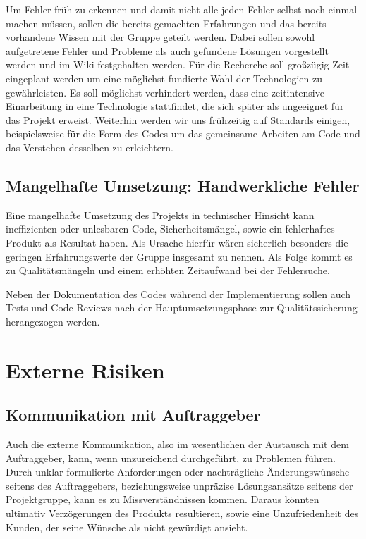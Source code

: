 \massnamen
  Um Fehler früh zu erkennen und damit nicht alle jeden Fehler selbst noch einmal machen müssen, sollen die bereits gemachten Erfahrungen und das bereits vorhandene Wissen mit der Gruppe geteilt werden.
  Dabei sollen sowohl aufgetretene Fehler und Probleme als auch gefundene Lösungen vorgestellt werden und im Wiki festgehalten werden.
  Für die Recherche soll großzügig Zeit eingeplant werden um eine möglichst fundierte Wahl der Technologien zu gewährleisten. Es soll möglichst verhindert werden, dass eine zeitintensive Einarbeitung in eine Technologie stattfindet, die sich später als ungeeignet für das Projekt erweist.
  Weiterhin werden wir uns frühzeitig auf Standards einigen, beispielsweise für die Form des Codes um das gemeinsame Arbeiten am Code und das Verstehen desselben zu erleichtern.

\subsection{Mangelhafte Umsetzung: {\glqq}Handwerkliche Fehler{\grqq}}\label{r10}
Eine mangelhafte Umsetzung des Projekts in technischer Hinsicht kann ineffizienten oder unlesbaren Code, Sicherheitsmängel, sowie ein fehlerhaftes Produkt als Resultat haben. Als Ursache hierfür wären sicherlich besonders die geringen Erfahrungswerte der Gruppe insgesamt zu nennen. Als Folge kommt es zu Qualitätsmängeln und einem erhöhten Zeitaufwand bei der Fehlersuche.

\massnamen
Neben der Dokumentation des Codes während der Implementierung sollen auch Tests und Code-Reviews nach der Hauptumsetzungsphase zur Qualitätssicherung herangezogen werden.

\section{Externe Risiken}

\subsection{Kommunikation mit Auftraggeber}\label{r3}
\bgroup
{}
  Auch die externe Kommunikation, also im wesentlichen der Austausch mit dem Auftraggeber, kann, wenn unzureichend durchgeführt, zu Problemen führen. Durch unklar formulierte Anforderungen oder nachträgliche Änderungswünsche seitens des Auftraggebers, beziehungsweise unpräzise Lösungsansätze seitens der Projektgruppe, kann es zu Missverständnissen kommen. Daraus könnten ultimativ Verzögerungen des Produkts resultieren, sowie eine Unzufriedenheit des Kunden, der seine Wünsche als nicht gewürdigt ansieht.
\egroup

